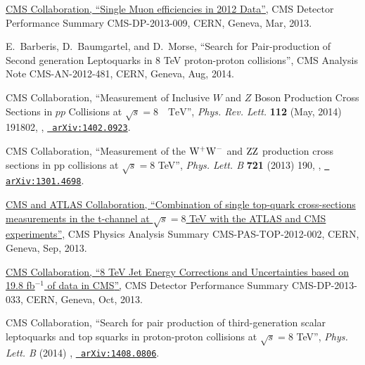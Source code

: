 \documentclass[12pt]{thesis}  %
\begin{document}
\begin{thebibliography}{100}
\href {https://cds.cern.ch/record/1536406} {{ CMS} Collaboration, ``{Single
  Muon efficiencies in 2012 Data}'',} CMS Detector Performance Summary
  CMS-DP-2013-009, CERN, Geneva, Mar, 2013.

\hrefCMSnoop {} {E.~Barberis, D.~Baumgartel, and D.~Morse, ``Search for
  Pair-production of Second generation Leptoquarks in 8 TeV proton-proton
  collisions'',} CMS Analysis Note CMS-AN-2012-481, CERN, Geneva, Aug, 2014.

\hrefCMSnoop {} {{ CMS} Collaboration, ``Measurement of Inclusive $W$ and $Z$
  Boson Production Cross Sections in $pp$ Collisions at $\sqrt{s}=8\text{
  }\text{ }\mathrm{TeV}$'',} \textit{ Phys. Rev. Lett.} \textbf{ 112} (May,
  2014) 191802,
  \href{http://dx.doi.org/10.1103/PhysRevLett.112.191802}{},
  \href{http://www.arXiv.org/abs/1402.0923}{\texttt{ arXiv:1402.0923}}.

\hrefCMSnoop {} {{ CMS} Collaboration, ``Measurement of the $\mathrm{W}^{+}\mathrm{W}^{-}$ and
  $\mathrm{Z}\mathrm{Z}$ production cross sections in pp collisions at $\sqrt{s} = 8$ TeV'',}
  \textit{ Phys. Lett. B} \textbf{ 721} (2013) 190,
  \href{http://dx.doi.org/10.1016/j.physletb.2013.03.027}{},
  \href{http://www.arXiv.org/abs/1301.4698}{\texttt{ arXiv:1301.4698}}.

\href {https://cds.cern.ch/record/1601029} {{ CMS and ATLAS} Collaboration,
  ``{Combination of single top-quark cross-sections measurements in the
  t-channel at $\sqrt{s} = 8$ TeV with the ATLAS and CMS experiments}'',} CMS
  Physics Analysis Summary CMS-PAS-TOP-2012-002, CERN, Geneva, Sep, 2013.

\href {https://cds.cern.ch/record/1627305} {{ CMS} Collaboration, ``{8 TeV Jet
  Energy Corrections and Uncertainties based on 19.8 fb$^{-1}$ of data in
  CMS}'',} CMS Detector Performance Summary CMS-DP-2013-033, CERN, Geneva, Oct,
  2013.

\hrefCMSnoop {} {{ CMS} Collaboration, ``Search for pair production of
  third-generation scalar leptoquarks and top squarks in proton-proton
  collisions at $\sqrt{s} = 8$ TeV'',} \textit{ Phys. Lett. B} (2014)
  \href{http://dx.doi.org/10.1016/j.physletb.2014.10.063}{},
  \href{http://www.arXiv.org/abs/1408.0806}{\texttt{ arXiv:1408.0806}}.


\end{thebibliography}
\end{document}
